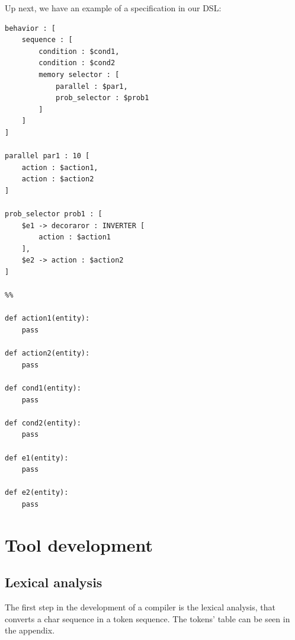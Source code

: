 \documentclass[a4paper,UKenglish,cleveref, autoref, thm-restate]{oasics-v2019}
\begin{document}
Up next, we have an example of a specification in our DSL:
\begin{lstlisting}
behavior : [
    sequence : [
        condition : $cond1,
        condition : $cond2
        memory selector : [
            parallel : $par1,
            prob_selector : $prob1
        ]
    ]
]

parallel par1 : 10 [
    action : $action1,
    action : $action2
]

prob_selector prob1 : [
    $e1 -> decoraror : INVERTER [
        action : $action1
    ],
    $e2 -> action : $action2
]

%%

def action1(entity):
    pass

def action2(entity):
    pass

def cond1(entity):
    pass

def cond2(entity):
    pass

def e1(entity):
    pass

def e2(entity):
    pass
\end{lstlisting}

\section{Tool development}
\label{sec:tool_development}
\subsection{Lexical analysis}
The first step in the development of a compiler is the lexical analysis, that converts a char sequence in a token sequence.
The tokens' table can be seen in the appendix.
\end{document}
